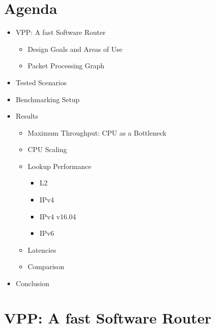 \section{Agenda}

\begin{frame}
    \begin{itemize}
            \item VPP: A fast Software Router
            \begin{itemize}
                \item Design Goals and Areas of Use
                \item Packet Processing Graph
            \end{itemize}
            \item Tested Scenarios
            \item Benchmarking Setup
            \item Results
            \begin{itemize}
                \item Maximum Throughput: CPU as a Bottleneck
                \item CPU Scaling
                \item Lookup Performance
                \begin{itemize}
                    \item L2
                    \item IPv4
                    \item IPv4 v16.04
                    \item IPv6
                \end{itemize}
                \item Latencies
                \item Comparison
            \end{itemize}
            \item Conclusion
        \end{itemize}
\end{frame}

\section{VPP: A fast Software Router}


